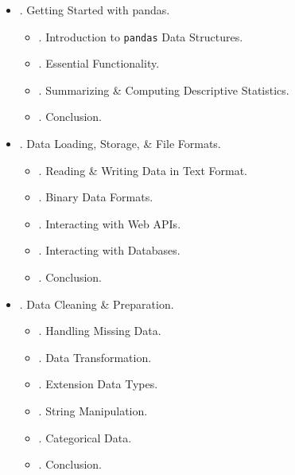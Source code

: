 \documentclass{article}
\newtheorem{remark}{Remark}
\begin{document}
\begin{enumerate}
\begin{itemize}
\begin{itemize}
\begin{itemize}
				\begin{remark}
					Keep in mind: this vectorized approach requires creating an array with {\tt nwalks * nsteps} elements, which may use a large amount of memory for large simulations. If memory is more constrained, then a different approach will be required.
				\end{remark}
			\end{itemize}
			\item {. Conclusion.} While much of rest of book will focus on building data wrangling skills with pandas -- xây dựng kỹ năng xử lý dữ liệu với pandas, continue to work in a similar array-based style. In Appendix A, dig deeper into NumPy features to help you further develop your array computing skills.
		\end{itemize}
		\item {. Getting Started with pandas.}
		\begin{itemize}
			\item {. Introduction to {\tt pandas} Data Structures.}
			\item {. Essential Functionality.}
			\item {. Summarizing \& Computing Descriptive Statistics.}
			\item {. Conclusion.}
		\end{itemize}
		\item {. Data Loading, Storage, \& File Formats.}
		\begin{itemize}
			\item {. Reading \& Writing Data in Text Format.}
			\item {. Binary Data Formats.}
			\item {. Interacting with Web APIs.}
			\item {. Interacting with Databases.}
			\item {. Conclusion.}
		\end{itemize}
		\item {. Data Cleaning \& Preparation.}
		\begin{itemize}
			\item {. Handling Missing Data.}
			\item {. Data Transformation.}
			\item {. Extension Data Types.}
			\item {. String Manipulation.}
			\item {. Categorical Data.}
			\item {. Conclusion.}

\end{itemize}
\end{itemize}
\end{enumerate}
\end{document}
